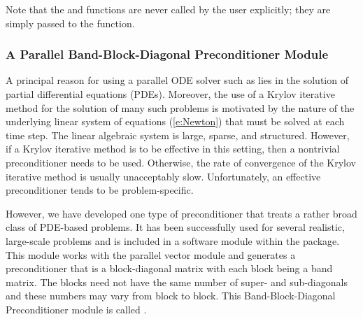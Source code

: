 Note that the  and  functions are never called 
by the user explicitly; they are simply passed to the  function.


\subsubsection{A Parallel Band-Block-Diagonal Preconditioner Module}\label{sss:cvbbdpre}

A principal reason for using a parallel ODE solver such as {\cvode} lies
in the solution of partial differential equations (PDEs).  Moreover,
the use of a Krylov iterative method for the solution of many such
problems is motivated by the nature of the underlying linear system of
equations (\ref{e:Newton}) that must be solved at each time step.  The
linear algebraic system is large, sparse, and structured. However, if
a Krylov iterative method is to be effective in this setting, then a
nontrivial preconditioner needs to be used.  Otherwise, the rate of
convergence of the Krylov iterative method is usually unacceptably
slow.  Unfortunately, an effective preconditioner tends to be
problem-specific.

However, we have developed one type of preconditioner that treats a
rather broad class of PDE-based problems.  It has been successfully
used for several realistic, large-scale problems \cite{HT98} and is
included in a software module within the {\cvode} package. This module
works with the parallel vector module {\nvecp} and 
generates a preconditioner that is a block-diagonal matrix with each
block being a band matrix. The blocks need not have the same number of
super- and sub-diagonals and these numbers may vary from block to
block. This Band-Block-Diagonal Preconditioner module is called
{\cvbbdpre}.

